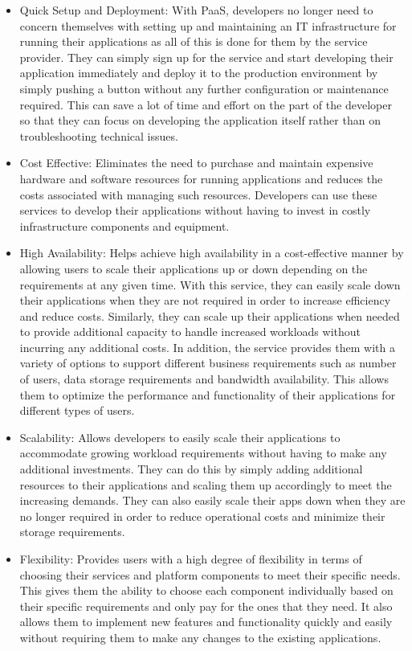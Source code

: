 \documentclass[MMR,Master,nenglish]{twbook}%
\begin{document}
\begin{itemize}
\item Quick Setup and Deployment: With PaaS, developers no longer need to concern themselves with setting up and maintaining an IT infrastructure for running their applications as all of this is done for them by the service provider. They can simply sign up for the service and start developing their application immediately and deploy it to the production environment by simply pushing a button without any further configuration or maintenance required. This can save a lot of time and effort on the part of the developer so that they can focus on developing the application itself rather than on troubleshooting technical issues.\cite{law2008}

\item Cost Effective: Eliminates the need to purchase and maintain expensive hardware and software resources for running applications and reduces the costs associated with managing such resources. Developers can use these services to develop their applications without having to invest in costly infrastructure components and equipment.\cite{gai2014}

\item High Availability: Helps achieve high availability in a cost-effective manner by allowing users to scale their applications up or down depending on the requirements at any given time. With this service, they can easily scale down their applications when they are not required in order to increase efficiency and reduce costs. Similarly, they can scale up their applications when needed to provide additional capacity to handle increased workloads without incurring any additional costs. In addition, the service provides them with a variety of options to support different business requirements such as number of users, data storage requirements and bandwidth availability. This allows them to optimize the performance and functionality of their applications for different types of users. 

\item Scalability: Allows developers to easily scale their applications to accommodate growing workload requirements without having to make any additional investments.\cite{law2008} They can do this by simply adding additional resources to their applications and scaling them up accordingly to meet the increasing demands. They can also easily scale their apps down when they are no longer required in order to reduce operational costs and minimize their storage requirements.

\item Flexibility: Provides users with a high degree of flexibility in terms of choosing their services and platform components to meet their specific needs. This gives them the ability to choose each component individually based on their specific requirements and only pay for the ones that they need. It also allows them to implement new features and functionality quickly and easily without requiring them to make any changes to the existing applications. 
\end{itemize}
\end{document}
